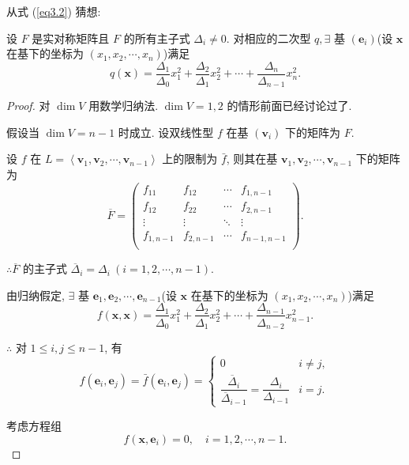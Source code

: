 \documentclass{ctexart}
\begin{document}
从式 (\ref{eq3.2}) 猜想:
\begin{theorem}\label{t3.6}
    设 $F$ 是实对称矩阵且 $F$ 的所有主子式 $\Delta_i\neq0$. 对相应的二次型 $q,\exists$ 基 $(\boldsymbol{e}_i)$(设 $\boldsymbol{x}$ 在基下的坐标为 $(x_1,x_2,\cdots,x_n)$)满足
    \[q(\boldsymbol{x})=\dfrac{\Delta_1}{\Delta_0}x_1^2+\dfrac{\Delta_2}{\Delta_1}x_2^2+\cdots+\dfrac{\Delta_n}{\Delta_{n-1}}x_n^2.\]
\end{theorem}
\begin{proof}
    对 $\dim V$ 用数学归纳法. $\dim V=1,2$ 的情形前面已经讨论过了.

    假设当 $\dim V=n-1$ 时成立. 设双线性型 $f$ 在基 $(\boldsymbol{v}_i)$ 下的矩阵为 $F$.

    设 $f$ 在 $L=\left<\boldsymbol{v}_1,\boldsymbol{v}_2,\cdots,\boldsymbol{v}_{n-1}\right>$ 上的限制为 $\bar{f}$, 则其在基 $\boldsymbol{v}_1,\boldsymbol{v}_2,\cdots,\boldsymbol{v}_{n-1}$ 下的矩阵为
    \[\overline{F}=\begin{pmatrix}
        f_{11} & f_{12} & \cdots & f_{1,n-1} \\
        f_{12} & f_{22} & \cdots & f_{2,n-1} \\
        \vdots & \vdots & \ddots & \vdots \\
        f_{1,n-1} & f_{2,n-1} & \cdots & f_{n-1,n-1} \\
    \end{pmatrix}.\]

    $\therefore\overline{F}$ 的主子式 $\overline{\Delta}_i=\Delta_i\ (i=1,2,\cdots,n-1)$.

    由归纳假定, $\exists$ 基 $\boldsymbol{e}_1,\boldsymbol{e}_2,\cdots,\boldsymbol{e}_{n-1}$(设 $\boldsymbol{x}$ 在基下的坐标为 $(x_1,x_2,\cdots,x_n)$)满足
    \[f(\boldsymbol{x},\boldsymbol{x})=\dfrac{\Delta_1}{\Delta_0}x_1^2+\dfrac{\Delta_2}{\Delta_1}x_2^2+\cdots+\dfrac{\Delta_{n-1}}{\Delta_{n-2}}x_{n-1}^2.\]

    $\therefore$ 对 $1\leq i,j\leq n-1$, 有
    \[f(\boldsymbol{e}_i,\boldsymbol{e}_j)=\bar{f}(\boldsymbol{e}_i,\boldsymbol{e}_j)=\begin{cases}
        0 & i\neq j, \\
        \dfrac{\overline{\Delta}_i}{\overline{\Delta}_{i-1}}=\dfrac{\Delta_i}{\Delta_{i-1}} & i=j.
    \end{cases}\]

    考虑方程组
    \[f(\boldsymbol{x},\boldsymbol{e}_i)=0,\quad i=1,2,\cdots,n-1.\]


\end{proof}
\end{document}
